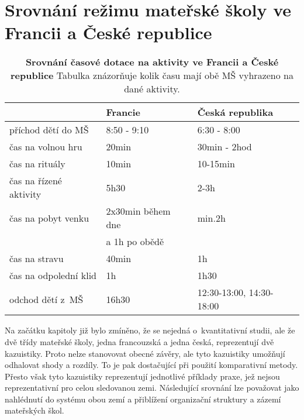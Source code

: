 \section{Srovnání režimu mateřské školy ve Francii a České republice} 
\label{srovnani} 

\begin{table}[h]
	\center
	\begin{tabular}{|l|l|l|}
	\hline
	\rowcolor{grey}
								& \textbf{Francie}				& \textbf{Česká republika}	\\
	\hline
	\hline
\rowcolor{grey!10}	 příchod dětí do MŠ			& 8:50 - 9:10				& 6:30 - 8:00			\\ 
\rowcolor{grey!50}	 čas na volnou hru 			& 20min 					&30min - 2hod 	\\ 
\rowcolor{grey!10}	 čas na rituály 			&10min 						&10-15min \\
\rowcolor{grey!50}	 čas na řízené aktivity		&5h30 						&2-3h   \\ 
\rowcolor{grey!10}	 čas na pobyt venku     	&2x30min během dne			&min.2h 	\\ 
\rowcolor{grey!10}								&a 1h po obědě				& \\ 
\rowcolor{grey!50}	 čas na stravu				&40min						&1h \\
\rowcolor{grey!10}	 čas na odpolední klid 	 	&1h 						&1h30 	\\
\rowcolor{grey!50}	 odchod dětí z~MŠ			&16h30						&12:30-13:00, 14:30-18:00	\\														 
	 \hline
	  
	\end{tabular}
	
	\caption{ \textbf{Srovnání časové dotace na aktivity ve Francii a České republice} Tabulka znázorňuje kolik času mají obě MŠ vyhrazeno na dané aktivity.
	}
	\label{srovnanirezimdne}
\end{table}


	Na začátku kapitoly již bylo zmíněno, že se nejedná o~kvantitativní studii, ale že dvě třídy mateřské školy, jedna francouzská a jedna česká, reprezentují dvě kazuistiky. Proto nelze stanovovat obecné závěry, ale tyto kazuistiky umožňují odhalovat shody a rozdíly. To je pak dostačující při použití komparativní metody. Přesto však tyto kazuistiky reprezentují jednotlivé příklady praxe, jež nejsou reprezentativní pro celou sledovanou zemi. Následující srovnání lze považovat jako nahlédnutí do systému obou zemí a přiblížení organizační struktury a zázemí mateřských škol.


